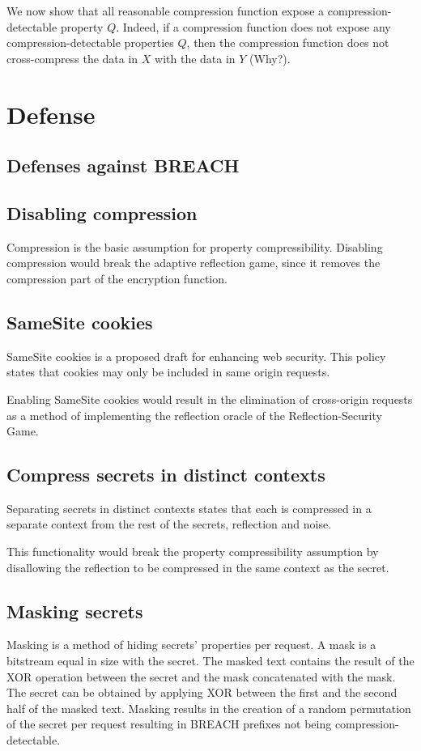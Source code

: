 \documentclass[a4paper, 11 pt, conference]{article}
\begin{document}
We now show that all reasonable compression function expose a
compression-detectable property $Q$. Indeed, if a compression function does not
expose any compression-detectable properties $Q$, then the compression function
does not cross-compress the data in $X$ with the data in $Y$ (Why?).

\section{Defense}\label{sec:defense}

\subsection{Defenses against BREACH}

\subsection{Disabling compression}\label{subsec:disablecom}
Compression is the basic assumption for property compressibility. Disabling
compression would break the adaptive reflection game, since it removes
the compression part of the encryption function.

\subsection{SameSite cookies}\label{subsec:samesite}
SameSite cookies \cite{c1} is a proposed draft for enhancing web security. This policy
states that cookies may only be included in same origin requests.

Enabling SameSite cookies would result in the elimination of cross-origin
requests as a method of implementing the reflection oracle of the
Reflection-Security Game.

\subsection{Compress secrets in distinct contexts}\label{subsec:contexts}
Separating secrets in distinct contexts states that each is compressed
in a separate context from the rest of the secrets, reflection and noise.

This functionality would break the property compressibility assumption by
disallowing the reflection to be compressed in the same context as the secret.

\subsection{Masking secrets}\label{subsec:masking}
Masking is a method of hiding secrets' properties per request. A mask is a
bitstream equal in size with the secret. The masked text contains the result of
the XOR operation between the secret and the mask concatenated with the mask.
The secret can be obtained by applying XOR between the first and the second
half of the masked text. Masking results in the creation of a random permutation
of the secret per request resulting in BREACH prefixes not being
compression-detectable.
\end{document}
